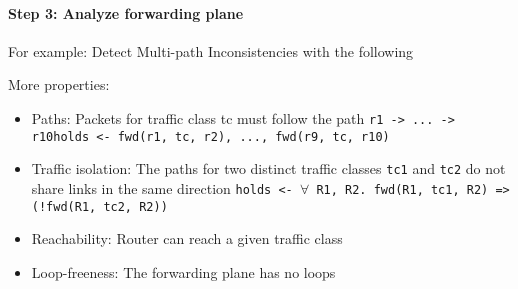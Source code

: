 \paragraph{Step 3: Analyze forwarding plane\newline}
For example: Detect Multi-path Inconsistencies with the following\newline
\vspace{0.5cm}
\begin{minipage}{0.5\linewidth}
        \centering      
        \def\svgwidth{\linewidth}
           
\end{minipage}
\vspace{0.5cm}
\newline More properties:\newline
\begin{itemize}
    \item Paths: Packets for traffic class tc must follow the path \texttt{r1 -> ... -> r10}\newline \texttt{holds <- fwd(r1, tc, r2), ..., fwd(r9, tc, r10)}
    \item Traffic isolation: The paths for two distinct traffic classes \texttt{tc1} and \texttt{tc2} do not share links in the same direction\newline 
\texttt{holds <- $\forall$ R1, R2. fwd(R1, tc1, R2) => (!fwd(R1, tc2, R2))}
    \item Reachability: Router can reach a given traffic class
    \item Loop-freeness: The forwarding plane has no loops
\end{itemize}


